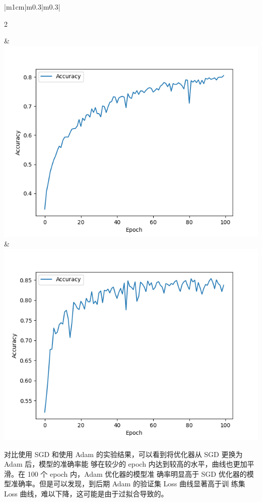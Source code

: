 \documentclass{article}%
\begin{document}
\begin{table}[H]
\begin{tabular}{|m{1cm}|m{0.3\linewidth}|m{0.3\linewidth}|}
        \begin{center} 2 \end{center}  &\vspace{5pt} \includegraphics[width=1\linewidth]{Acc_5.png} &\vspace{5pt} \includegraphics[width=1\linewidth]{Acc_6.png} \\[0.6cm]
        \hline
    \end{tabular}
    \caption{使用不同优化器——Accuracy曲线}
\end{table}

对比使用 SGD 和使用 Adam 的实验结果，可以看到将优化器从 SGD 更换为 Adam 后，模型的准确率能
够在较少的 epoch 内达到较高的水平，曲线也更加平滑。在 100 个 epoch 内，Adam 优化器的模型准
确率明显高于 SGD 优化器的模型准确率。但是可以发现，到后期 Adam 的验证集 Loss 曲线显著高于训
练集 Loss 曲线，难以下降，这可能是由于过拟合导致的。
\end{document}
